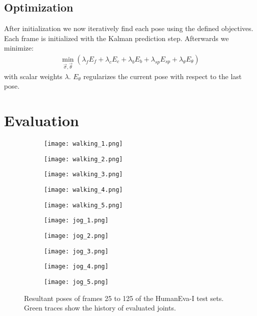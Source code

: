 \documentclass[10pt,twocolumn,letterpaper]{article}
\begin{document}
\subsection{Optimization}

After initialization we now iteratively find each pose using the defined objectives. Each frame is initialized with the Kalman prediction step. Afterwards we minimize:
\begin{equation}
\begin{aligned} 
\min_{\vec{\sigma}, \vec{\theta}} (\lambda_{f} E_f + \lambda_{c} E_c + \lambda_{b} E_b + \lambda_{sp} E_{sp} + \lambda_{\theta} E_\theta)
\end{aligned}
\end{equation}
with scalar weights $\lambda$. $E_\theta$ regularizes the current pose with respect to the last pose.


\section{Evaluation}

\begin{figure*}
	\centering
	\begin{subfigure}[b]{0.20\textwidth}
		\texttt{[image: walking\_1.png]}
	\end{subfigure}%
	\begin{subfigure}[b]{0.20\textwidth}
		\texttt{[image: walking\_2.png]}
	\end{subfigure}%
	\begin{subfigure}[b]{0.20\textwidth}
		\texttt{[image: walking\_3.png]}
	\end{subfigure}%
	\begin{subfigure}[b]{0.20\textwidth}
		\texttt{[image: walking\_4.png]}
	\end{subfigure}%
	\begin{subfigure}[b]{0.20\textwidth}
		\texttt{[image: walking\_5.png]}
	\end{subfigure}
	\begin{subfigure}[b]{0.20\textwidth}
		\texttt{[image: jog\_1.png]}
	\end{subfigure}%
	\begin{subfigure}[b]{0.20\textwidth}
		\texttt{[image: jog\_2.png]}
	\end{subfigure}%
	\begin{subfigure}[b]{0.20\textwidth}
		\texttt{[image: jog\_3.png]}
	\end{subfigure}%
	\begin{subfigure}[b]{0.20\textwidth}
		\texttt{[image: jog\_4.png]}
	\end{subfigure}%
	\begin{subfigure}[b]{0.20\textwidth}
		\texttt{[image: jog\_5.png]}
	\end{subfigure}
	\caption{Resultant poses of frames 25 to 125 of the HumanEva-I test sets. Green traces show the history of evaluated joints.}
	\label{fig:results_he}
\end{figure*}
\end{document}

